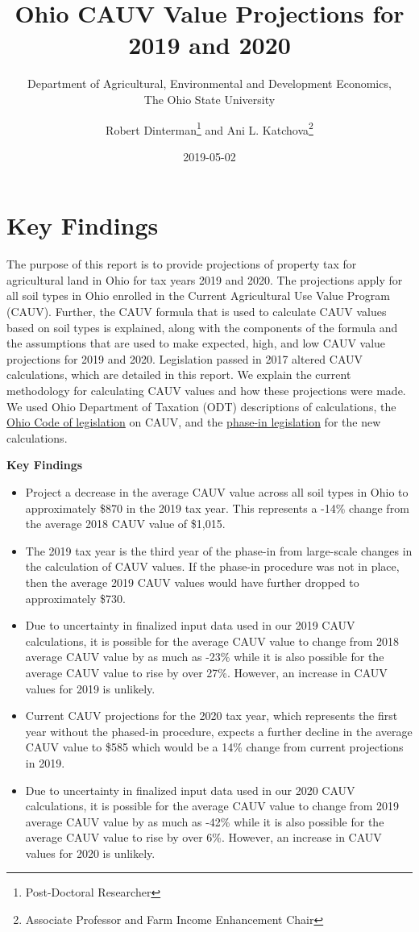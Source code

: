 \documentclass[]{article}
\title{Ohio CAUV Value Projections for 2019 and 2020}
\subtitle{Department of Agricultural, Environmental and Development Economics,\\
The Ohio State University}
\author{Robert Dinterman\footnote{Post-Doctoral Researcher} and Ani L.
Katchova\footnote{Associate Professor and Farm Income Enhancement Chair}}
\date{2019-05-02}
\providecommand{\tightlist}{%
  \setlength{\itemsep}{0pt}\setlength{\parskip}{0pt}}
\begin{document}
\maketitle

\hypertarget{key-findings}{%
\section{Key Findings}\label{key-findings}}

The purpose of this report is to provide projections of property tax for
agricultural land in Ohio for tax years 2019 and 2020. The projections
apply for all soil types in Ohio enrolled in the Current Agricultural
Use Value Program (CAUV). Further, the CAUV formula that is used to
calculate CAUV values based on soil types is explained, along with the
components of the formula and the assumptions that are used to make
expected, high, and low CAUV value projections for 2019 and 2020.
Legislation passed in 2017 altered CAUV calculations, which are detailed
in this report. We explain the current methodology for calculating CAUV
values and how these projections were made. We used Ohio Department of
Taxation (ODT) descriptions of calculations, the
\href{http://codes.ohio.gov/orc/5713.31}{Ohio Code of legislation} on
CAUV, and the \href{http://codes.ohio.gov/orc/5715.01}{phase-in
legislation} for the new calculations.

\textbf{Key Findings}

\begin{itemize}
\tightlist
\item
  Project a decrease in the average CAUV value across all soil types in
  Ohio to approximately \$870 in the 2019 tax year. This represents a
  -14\% change from the average 2018 CAUV value of \$1,015.
\item
  The 2019 tax year is the third year of the phase-in from large-scale
  changes in the calculation of CAUV values. If the phase-in procedure
  was not in place, then the average 2019 CAUV values would have further
  dropped to approximately \$730.
\item
  Due to uncertainty in finalized input data used in our 2019 CAUV
  calculations, it is possible for the average CAUV value to change from
  2018 average CAUV value by as much as -23\% while it is also possible
  for the average CAUV value to rise by over 27\%. However, an increase
  in CAUV values for 2019 is unlikely.
\item
  Current CAUV projections for the 2020 tax year, which represents the
  first year without the phased-in procedure, expects a further decline
  in the average CAUV value to \$585 which would be a 14\% change from
  current projections in 2019.
\item
  Due to uncertainty in finalized input data used in our 2020 CAUV
  calculations, it is possible for the average CAUV value to change from
  2019 average CAUV value by as much as -42\% while it is also possible
  for the average CAUV value to rise by over 6\%. However, an increase
  in CAUV values for 2020 is unlikely.
\end{itemize}
\end{document}
